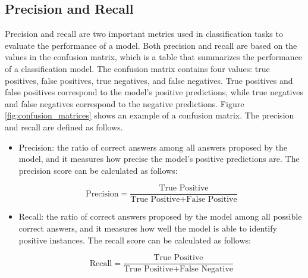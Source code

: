     \subsection{Precision and Recall}
    Precision and recall are two important metrics used in classification tasks to evaluate the performance of a model. 
    Both precision and recall are based on the values in the confusion matrix, which is a table that summarizes the performance of a classification model. The confusion matrix contains four values: true positives, false positives, true negatives, and false negatives. True positives and false positives correspond to the model's positive predictions, while true negatives and false negatives correspond to the negative predictions. Figure \ref{fig:confusion_matrices} shows an example of a confusion matrix. The precision and recall are defined as follows.
        

    \begin{itemize}
        \item Precision: the ratio of correct answers among all answers proposed by the model, and it measures how precise the model's positive predictions are. The precision score can be calculated as follows:
        
        \begin{equation}
            \text{Precision} = \frac{\text{True Positive}}{\text{True Positive} + \text{False Positive}}
        \end{equation}
        
        \item Recall: the ratio of correct answers proposed by the model among all possible correct answers, and it measures how well the model is able to identify positive instances. The recall score can be calculated as follows:

        \begin{equation}
            \text{Recall} = \frac{\text{True Positive}}{\text{True Positive} + \text{False Negative}}
        \end{equation}
    \end{itemize}


